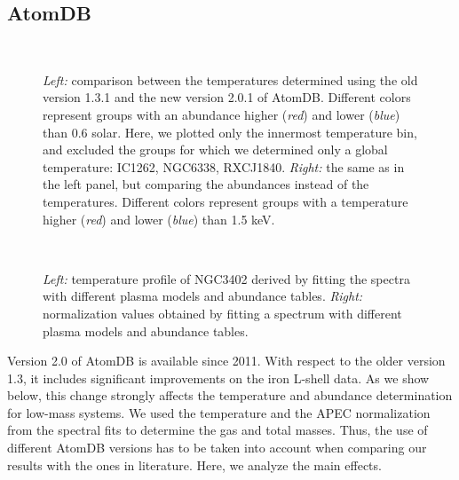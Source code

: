 \documentclass{aa} %
\begin{document}
\begin{appendix}
\section{AtomDB} \label{app_atom}

\begin{figure*}[!t]
\begin{center}
\hbox{
}
\end{center}
\caption{\footnotesize
{{\it Left:} comparison between the temperatures determined using the old version 1.3.1 and the new version 2.0.1 of AtomDB. Different colors represent groups with an abundance higher ({\it red}) and lower ({\it blue}) than 0.6 solar. Here, we plotted only the innermost temperature bin, and excluded the groups for which we determined only a global temperature: IC1262, NGC6338, RXCJ1840. {\it Right:} the same as in the left panel, but comparing the abundances instead of the temperatures. Different colors represent groups with a temperature higher ({\it red}) and lower ({\it blue}) than 1.5 keV.}}
\label{fig:atomDB}
\end{figure*}

\begin{figure*}[!t]
\begin{center}
\hbox{
}
\end{center}
\caption{\footnotesize
{{\it Left:} temperature profile of NGC3402 derived by fitting the spectra with different plasma models and abundance tables. {\it Right:} normalization values obtained by fitting a spectrum with different plasma models and abundance tables.}}
\label{fig:ngc3402}
\end{figure*}

Version 2.0 of AtomDB is available since 2011. With respect to the
older version 1.3, it includes significant improvements on the iron
L-shell data. As we show below, this change strongly affects the
temperature and abundance determination for low-mass systems. We used
 the temperature and the APEC normalization from the spectral
fits to determine the gas and total masses. Thus, the
use of different AtomDB versions has to be taken into account when
comparing our results with the ones in literature. Here, we analyze
the main effects.

\end{appendix}
\end{document}
